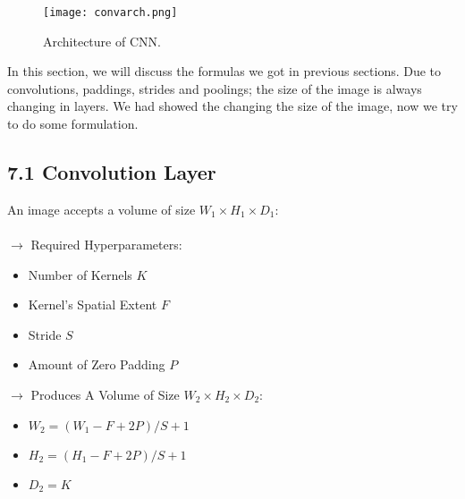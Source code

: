 \documentclass[11pt]{article}
\begin{document}
\begin{figure}[H]
\centering
\texttt{[image: convarch.png]}
\caption{Architecture of CNN.}
\label{fig:figure3}
\end{figure}
In this section, we will discuss the formulas we got in previous sections. Due to convolutions, paddings, strides and poolings; the size of the image is always changing in layers. We had showed the changing the size of the image, now we try to do some formulation.
\subsection{7.1 Convolution Layer}
\hspace*{1cm} An image accepts a volume of size $W_1 \times H_1 \times D_1$:
\\
\\
$\rightarrow$ Required Hyperparameters:
\begin{itemize}
	\item Number of Kernels $K$
	\item Kernel's Spatial Extent $F$
	\item Stride $S$
	\item Amount of Zero Padding $P$
\end{itemize}
$\rightarrow$ Produces A Volume of Size $W_2 \times H_2 \times D_2$:
\begin{itemize}
	\item $W_2 = (W_1 - F + 2P)/S +1$
	\item $H_2 = (H_1 - F + 2P)/S +1$
	\item $D_2 = K$
\end{itemize}
\end{document}
